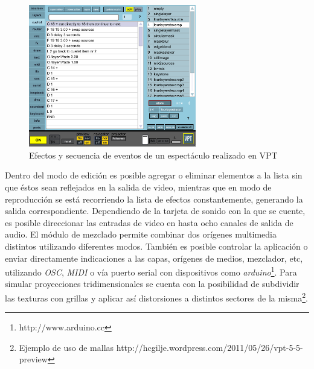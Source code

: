 \begin{figure}[H]
  \centering
    \includegraphics[width=0.65\textwidth]{./Apendices/Cap3_aplicaciones/apps-vpt-cuelist.png}
  \caption[http://hcgilje.wordpress.com/VPT]{Efectos y secuencia de eventos de un espectáculo realizado en VPT}
  \label{fig:Apps-VPTCuelist}
\end{figure}

Dentro del modo de edición es posible agregar o eliminar elementos a la lista sin que éstos sean reflejados en la salida de video, mientras que en modo de reproducción se está recorriendo la lista de efectos constantemente, generando la salida correspondiente.
Dependiendo de la tarjeta de sonido con la que se cuente, es posible direccionar las entradas de video en hasta ocho canales de salida de audio. El módulo de mezclado permite combinar dos orígenes multimedia distintos utilizando diferentes modos. También es posible controlar la aplicación o enviar directamente indicaciones a las capas, orígenes de medios, mezclador, etc, utilizando \emph{OSC}, \emph{MIDI} o vía puerto serial con dispositivos como \emph{arduino}\footnote{http://www.arduino.cc}.
Para simular proyecciones tridimensionales se cuenta con la posibilidad de subdividir las texturas con grillas y aplicar así distorsiones a distintos sectores de la misma\footnote{Ejemplo de uso de mallas http://hcgilje.wordpress.com/2011/05/26/vpt-5-5-preview}.
